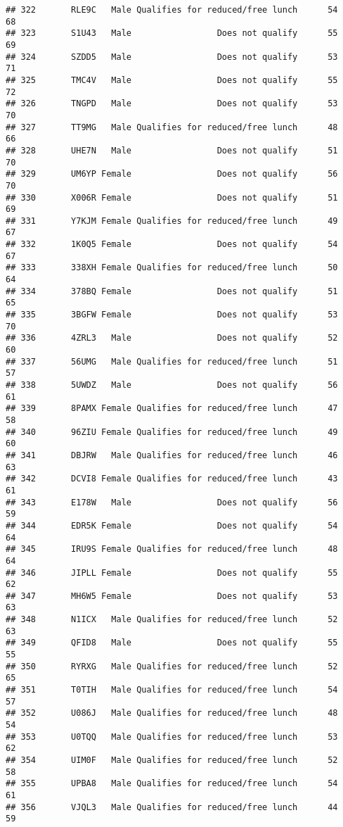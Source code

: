 \documentclass[
]{article}
\begin{document}
\begin{verbatim}
## 322       RLE9C   Male Qualifies for reduced/free lunch      54       68
## 323       S1U43   Male                 Does not qualify      55       69
## 324       SZDD5   Male                 Does not qualify      53       71
## 325       TMC4V   Male                 Does not qualify      55       72
## 326       TNGPD   Male                 Does not qualify      53       70
## 327       TT9MG   Male Qualifies for reduced/free lunch      48       66
## 328       UHE7N   Male                 Does not qualify      51       70
## 329       UM6YP Female                 Does not qualify      56       70
## 330       X006R Female                 Does not qualify      51       69
## 331       Y7KJM Female Qualifies for reduced/free lunch      49       67
## 332       1K0Q5 Female                 Does not qualify      54       67
## 333       338XH Female Qualifies for reduced/free lunch      50       64
## 334       378BQ Female                 Does not qualify      51       65
## 335       3BGFW Female                 Does not qualify      53       70
## 336       4ZRL3   Male                 Does not qualify      52       60
## 337       56UMG   Male Qualifies for reduced/free lunch      51       57
## 338       5UWDZ   Male                 Does not qualify      56       61
## 339       8PAMX Female Qualifies for reduced/free lunch      47       58
## 340       96ZIU Female Qualifies for reduced/free lunch      49       60
## 341       DBJRW   Male Qualifies for reduced/free lunch      46       63
## 342       DCVI8 Female Qualifies for reduced/free lunch      43       61
## 343       E178W   Male                 Does not qualify      56       59
## 344       EDR5K Female                 Does not qualify      54       64
## 345       IRU9S Female Qualifies for reduced/free lunch      48       64
## 346       JIPLL Female                 Does not qualify      55       62
## 347       MH6W5 Female                 Does not qualify      53       63
## 348       N1ICX   Male Qualifies for reduced/free lunch      52       63
## 349       QFID8   Male                 Does not qualify      55       55
## 350       RYRXG   Male Qualifies for reduced/free lunch      52       65
## 351       T0TIH   Male Qualifies for reduced/free lunch      54       57
## 352       U086J   Male Qualifies for reduced/free lunch      48       54
## 353       U0TQQ   Male Qualifies for reduced/free lunch      53       62
## 354       UIM0F   Male Qualifies for reduced/free lunch      52       58
## 355       UPBA8   Male Qualifies for reduced/free lunch      54       61
## 356       VJQL3   Male Qualifies for reduced/free lunch      44       59

\end{verbatim}
\end{document}
